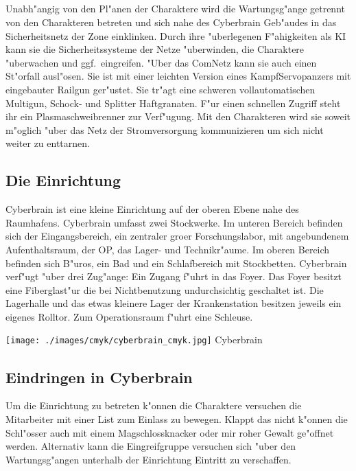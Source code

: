 \subsection{\xl} 
Unabh"angig von den Pl"anen der Charaktere wird \xl{} die Wartungsg"ange getrennt von den Charakteren betreten und sich nahe des Cyberbrain Geb"audes in das Sicherheitsnetz der Zone einklinken. Durch ihre "uberlegenen F"ahigkeiten als KI kann sie die Sicherheitssysteme der Netze "uberwinden, die Charaktere "uberwachen und ggf.~eingreifen. "Uber das ComNetz kann sie auch einen St"orfall ausl"osen. Sie ist mit einer leichten Version eines KampfServopanzers mit eingebauter Railgun ger"ustet. Sie tr"agt eine schweren vollautomatischen Multigun, Schock- und Splitter Haftgranaten. F"ur einen schnellen Zugriff steht ihr ein Plasmaschwei\3brenner zur Verf"ugung. Mit den Charakteren wird sie soweit m"oglich "uber das Netz der Stromversorgung kommunizieren um sich nicht weiter zu enttarnen.

\subsection{Die Einrichtung} 
Cyberbrain ist eine kleine Einrichtung auf der oberen Ebene nahe des Raumhafens. Cyberbrain umfasst zwei Stockwerke. Im unteren Bereich befinden sich der Eingangsbereich, ein zentraler gro\3er Forschungslabor, mit angebundenem Aufenthaltsraum, der OP, das Lager- und Technikr"aume. Im oberen Bereich befinden sich B"uros, ein Bad und ein Schlafbereich mit Stockbetten. Cyberbrain verf"ugt "uber drei Zug"ange: Ein Zugang f"uhrt in das Foyer. Das Foyer besitzt eine Fiberglast"ur die bei Nichtbenutzung undurchsichtig geschaltet ist. Die Lagerhalle und das etwas kleinere Lager der Krankenstation besitzen jeweils ein eigenes Rolltor. Zum Operationsraum f"uhrt eine Schleuse.

\begin{figure*}[htbp]
	\centering
    \texttt{[image: ./images/cmyk/cyberbrain\_cmyk.jpg]}
    \newline{}Cyberbrain
	\label{fig:cyberbrain}
\end{figure*}

\subsection{Eindringen in Cyberbrain} 
Um die Einrichtung zu betreten k"onnen die Charaktere versuchen die Mitarbeiter mit einer List zum Einlass zu bewegen. Klappt das nicht k"onnen die Schl"osser auch mit einem Magschlossknacker oder mir roher Gewalt ge"offnet werden. Alternativ kann die Eingreifgruppe versuchen sich "uber den Wartungsg"angen unterhalb der Einrichtung Eintritt zu verschaffen.

